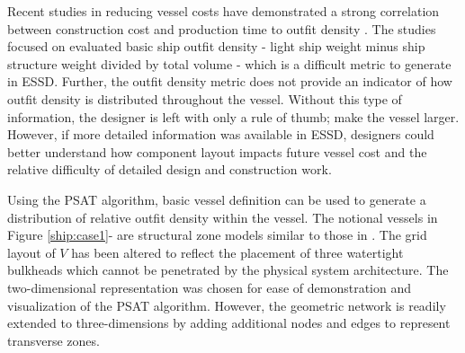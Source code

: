 \documentclass[preprint,12pt]{elsarticle}
\begin{document}
Recent studies in reducing vessel costs have demonstrated a strong correlation between construction cost and production time to outfit density \citep{Keane2011,Keane2015}. The studies focused on evaluated basic ship outfit density - light ship weight minus ship structure weight divided by total volume \citep{Keane2015} - which is a difficult metric to generate in ESSD. Further, the outfit density metric does not provide an indicator of how outfit density is distributed throughout the vessel. Without this type of information, the designer is left with only a rule of thumb; make the vessel larger. However, if more detailed information was available in ESSD, designers could better understand how component layout impacts future vessel cost and the relative difficulty of detailed design and construction work.

Using the PSAT algorithm, basic vessel definition can be used to generate a distribution of relative outfit density within the vessel. The notional vessels in Figure \ref{ship:case1}- are structural zone models similar to those in \cite{Gillespie2013}. The grid layout of $V$ has been altered to reflect the placement of three watertight bulkheads which cannot be penetrated by the physical system architecture. The two-dimensional representation was chosen for ease of demonstration and visualization of the PSAT algorithm. However, the geometric network is readily extended to three-dimensions by adding additional nodes and edges to represent transverse zones. 

%	
\end{document}
